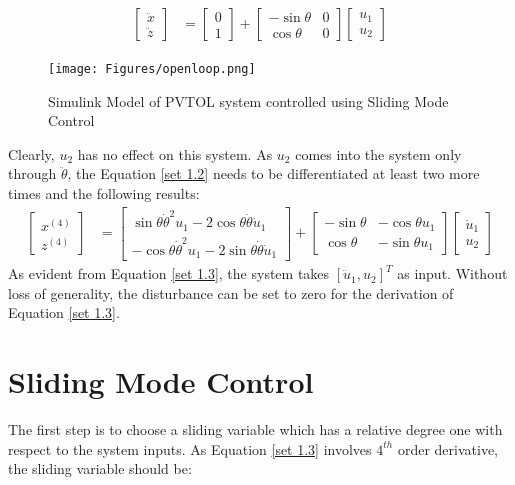 \documentclass{article}
\begin{document}
\begin{align}
\left[\begin{array}{cc}\ddot{x}\\\ddot{z}\end{array}\right] &= \left[\begin{array}{c}0\\1\end{array}\right] + \left[\begin{array}{cc}-\sin\theta & 0\\\cos \theta &0 \end{array}\right] \left[\begin{array}{c}u_1\\u_2\end{array}\right] \label{set 1.2}
\end{align}\begin{figure}[H]
\centering
\texttt{[image: Figures/openloop.png]}
\caption{Simulink Model of PVTOL system controlled using Sliding Mode Control }
\label{fig:figure2}
\end{figure}


Clearly, $u_2$ has no effect on this system. As $u_2$ comes into the system only through $\ddot{\theta}$, the Equation \ref{set 1.2} needs to be differentiated at least two more times and the following results:
\begin{align}
\left[\begin{array}{cc}x^{(4)}\\z^{(4)}\end{array}\right] &= \left[\begin{array}{c}
\sin \theta \dot{\theta}^2u_1-2\cos \theta \dot{\theta}\dot{u}_1
\\-\cos \theta \dot{\theta}^2u_1-2\sin \theta \dot{\theta}\dot{u}_1
\end{array}\right] + \left[\begin{array}{cc}-\sin\theta & -\cos \theta u_1\\
\cos \theta &-\sin \theta u_1 \end{array}\right] \left[\begin{array}{c}\ddot{u}_1\\u_2\end{array}\right] \label{set 1.3}
\end{align}
As evident from Equation \ref{set 1.3}, the system takes $[\ddot{u}_1,u_2]^T$ as input.
Without loss of generality, the disturbance can be set to zero for the derivation of Equation \ref{set 1.3}.
\section{Sliding Mode Control}
\label{SMC}
The first step is to choose a sliding variable which has a relative degree one with respect to the system inputs. As Equation \ref{set 1.3} involves $4^{th}$ order derivative, the sliding variable should be:
\end{document}

